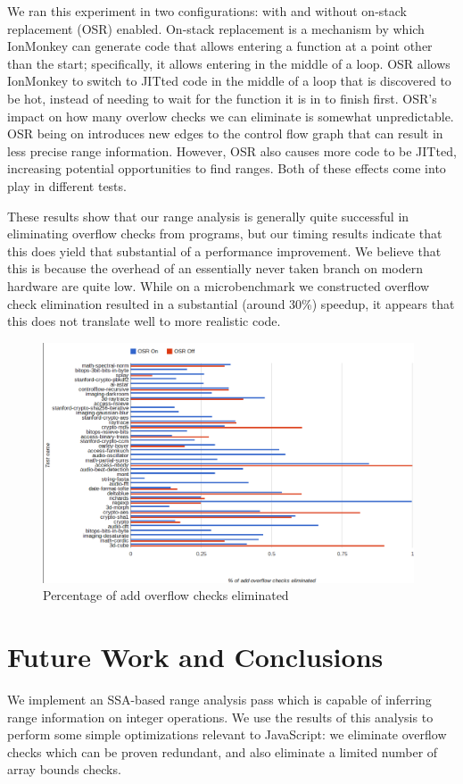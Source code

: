 \documentclass{article}
\begin{document}
We ran this experiment in two configurations: with and without
on-stack replacement (OSR) enabled. On-stack replacement is a
mechanism by which IonMonkey can generate code that allows entering a
function at a point other than the start; specifically, it allows
entering in the middle of a loop. OSR allows IonMonkey to switch to
JITted code in the middle of a loop that is discovered to be hot,
instead of needing to wait for the function it is in to finish
first. OSR's impact on how many overlow checks we can eliminate is
somewhat unpredictable. OSR being on introduces new edges to the
control flow graph that can result in less precise range
information. However, OSR also causes more code to be JITted,
increasing potential opportunities to find ranges. Both of these
effects come into play in different tests. 

These results show that our range analysis is generally quite
successful in eliminating overflow checks from programs, but our
timing results indicate that this does yield that substantial of a
performance improvement. We believe that this is because the overhead
of an essentially never taken branch on modern hardware are quite
low. While on a microbenchmark we constructed overflow check
elimination resulted in a substantial (around 30\%) speedup, it appears that
this does not translate well to more realistic code.

\begin{figure}[!ht]
\centering
\includegraphics[width=0.98\textwidth]{counts_graph.png}
\caption{Percentage of add overflow checks eliminated}
\label{fig:count}
\end{figure}


\section{Future Work and Conclusions}
We implement an SSA-based range analysis pass which is capable of
inferring range information on integer operations. We use the results
of this analysis to perform some simple optimizations relevant to
JavaScript: we eliminate overflow checks which can be proven
redundant, and also eliminate a limited number of array bounds checks.
\end{document}
